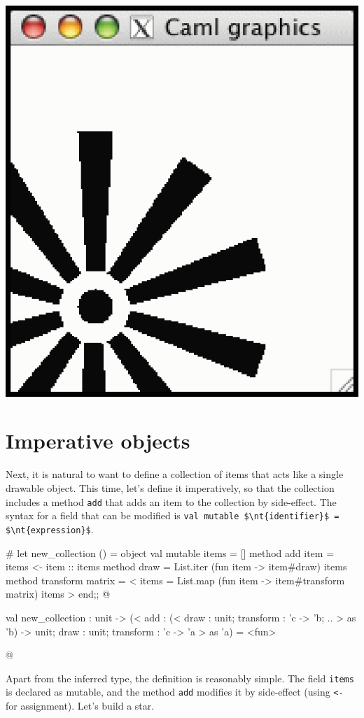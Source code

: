 \centerline{\includegraphics[scale=0.3]{graphics2}}

\section{Imperative objects}

\label{keyword:mutable(objects)}
Next, it is natural to want to define a collection of items that acts like a single drawable object.
This time, let's define it imperatively, so that the collection includes a method \hbox{\lstinline/add/}
that adds an item to the collection by side-effect.  The syntax for a field that can be modified is
\hbox{\lstinline/val mutable $\nt{identifier}$ = $\nt{expression}$/}.

\label{keyword:<-(object-field-assignment)}
\begin{ocaml}
# let new_collection () =
object
   val mutable items = []
   method add item = items <- item :: items
   method draw = List.iter (fun item -> item#draw) items
   method transform matrix =
      {< items = List.map (fun item -> item#transform matrix) items >}
end;;
@
\begin{topoutput}
val new_collection :
  unit ->
  (< add : (< draw : unit; transform : 'c -> 'b; .. > as 'b) -> unit;
     draw : unit; transform : 'c -> 'a >
   as 'a) = <fun>
\end{topoutput}
@
\end{ocaml}
%
Apart from the inferred type, the definition is reasonably simple.  The field \hbox{\lstinline/items/} is
declared as mutable, and the method \hbox{\lstinline/add/} modifies it by side-effect (using \hbox{\lstinline/<-/}
for assignment).  Let's build a star.

